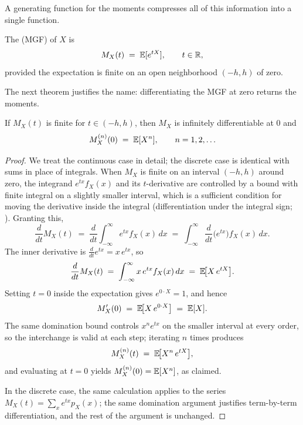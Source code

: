 A generating function for the moments compresses all of this information into a single function.

\begin{definition}\label{def:mgf}
The  (MGF) of \(X\) is
\[
  M_X(t) \;=\; \mathbb{E}[e^{tX}], \qquad t \in \mathbb{R},
\]
provided the expectation is finite on an open neighborhood \((-h, h)\) of zero.
\end{definition}

The next theorem justifies the name: differentiating the MGF at zero returns the moments.

\begin{theorem}\label{thm:mgf-generates-moments}
If \(M_X(t)\) is finite for \(t \in (-h, h)\), then \(M_X\) is infinitely differentiable at \(0\) and
\[
  M_X^{(n)}(0) \;=\; \mathbb{E}[X^n], \qquad n = 1, 2, \ldots
\]
\end{theorem}

\begin{proof}
We treat the continuous case in detail; the discrete case is identical with sums in place of integrals. When \(M_X\) is finite on an interval \((-h, h)\) around zero, the integrand \(e^{tx} f_X(x)\) and its \(t\)-derivative are controlled by a bound with finite integral on a slightly smaller interval, which is a sufficient condition for moving the derivative inside the integral (differentiation under the integral sign; \citealp[][\S~2.4]{Casella2002}). Granting this,
\[
  \frac{d}{dt} M_X(t)
  \;=\; \frac{d}{dt} \int_{-\infty}^\infty e^{tx} f_X(x)\, dx
  \;=\; \int_{-\infty}^\infty \frac{d}{dt}\!\bigl(e^{tx}\bigr) f_X(x)\, dx.
\]
The inner derivative is \(\frac{d}{dt} e^{tx} = x\, e^{tx}\), so
\[
  \frac{d}{dt} M_X(t)
  \;=\; \int_{-\infty}^\infty x\, e^{tx} f_X(x)\, dx
  \;=\; \mathbb{E}\!\bigl[X\, e^{tX}\bigr].
\]
Setting \(t = 0\) inside the expectation gives \(e^{0 \cdot X} = 1\), and hence
\[
  M_X'(0) \;=\; \mathbb{E}\!\bigl[X\, e^{0 \cdot X}\bigr] \;=\; \mathbb{E}[X].
\]
The same domination bound controls \(x^n e^{tx}\) on the smaller interval at every order, so the interchange is valid at each step; iterating \(n\) times produces
\[
  M_X^{(n)}(t) \;=\; \mathbb{E}\!\bigl[X^n\, e^{tX}\bigr],
\]
and evaluating at \(t = 0\) yields \(M_X^{(n)}(0) = \mathbb{E}[X^n]\), as claimed.

In the discrete case, the same calculation applies to the series \(M_X(t) = \sum_x e^{tx} p_X(x)\); the same domination argument justifies term-by-term differentiation, and the rest of the argument is unchanged.
\end{proof}

